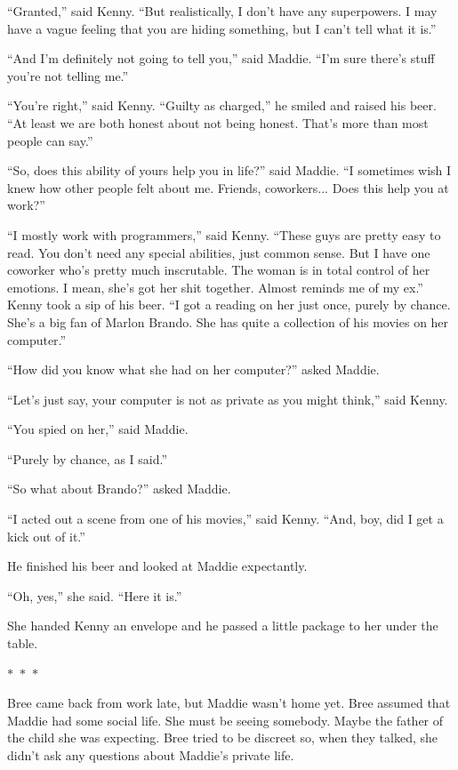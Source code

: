 \documentclass{memoir}
\newcommand{\starbreak}{%
\begin{center}
  $\ast$~$\ast$~$\ast$
\end{center}
}
\begin{document}
``Granted,'' said Kenny. ``But realistically, I don't have any superpowers. I may have a vague feeling that you are hiding something, but I can't tell what it is.''

``And I'm definitely not going to tell you,'' said Maddie. ``I'm sure there's stuff you're not telling me.''

``You're right,'' said Kenny. ``Guilty as charged,'' he smiled and raised his beer. ``At least we are both honest about not being honest. That's more than most people can say.''

``So, does this ability of yours help you in life?'' said Maddie. ``I sometimes wish I knew how other people felt about me. Friends, coworkers... Does this help you at work?''

``I mostly work with programmers,'' said Kenny. ``These guys are pretty easy to read. You don't need any special abilities, just common sense. But I have one coworker who's pretty much inscrutable. The woman is in total control of her emotions. I mean, she's got her shit together. Almost reminds me of my ex.'' Kenny took a sip of his beer. ``I got a reading on her just once, purely by chance. She's a big fan of Marlon Brando. She has quite a collection of his movies on her computer.''

``How did you know what she had on her computer?'' asked Maddie.

``Let's just say, your computer is not as private as you might think,'' said Kenny.

``You spied on her,'' said Maddie.

``Purely by chance, as I said.''

``So what about Brando?'' asked Maddie.

``I acted out a scene from one of his movies,'' said Kenny. ``And, boy, did I get a kick out of it.'' 

He finished his beer and looked at Maddie expectantly.

``Oh, yes,'' she said. ``Here it is.''

She handed Kenny an envelope and he passed a little package to her under the table.

\starbreak

Bree came back from work late, but Maddie wasn't home yet. Bree assumed that Maddie had some social life. She must be seeing somebody. Maybe the father of the child she was expecting. Bree tried to be discreet so, when they talked, she didn't ask any questions about Maddie's private life. 
\end{document}
